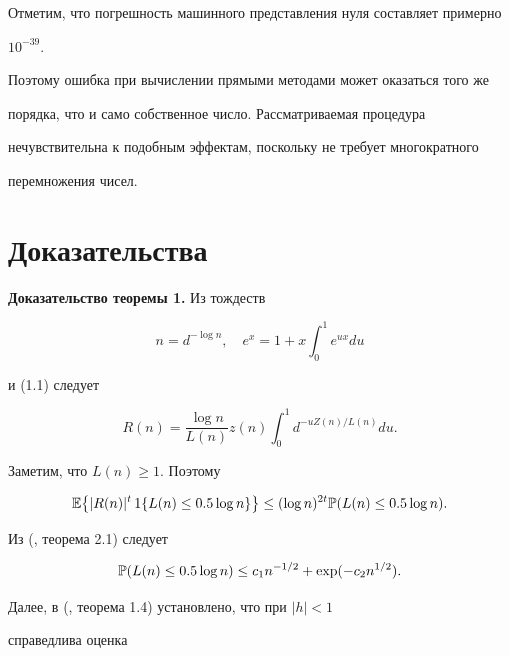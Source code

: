  


Отметим, что погрешность машинного представления нуля составляет примерно 


$10^{-39}$. 


Поэтому ошибка при вычислении прямыми методами может оказаться того же 


порядка, что и само собственное число. Рассматриваемая процедура 


нечувствительна к подобным эффектам, поскольку не требует многократного 


перемножения чисел. 


 


\section{Доказательства} 


 


{\bf Доказательство теоремы 1.} Из тождеств 


$$ 


n=d^{-\log n},\quad e^x=1+x\int^1_0 e^{ux}du 


$$ 


и (1.1) следует 


\begin{equation} 


R(n)=\frac{\log n}{L(n)} z(n)\int^1_0 d^{-uZ(n)/L(n)}du. 


\end{equation} 


Заметим, что $L(n)\ge 1$. Поэтому 


\begin{equation} 


\Bbb E\bigl\{|R(n)|^t\,1\{L(n)\le 0{.}5\log n\}\bigr\}\le 


(\log n)^{2t}\Bbb P(L(n)\le 0{.}5\log n). 


\end{equation} 


Из (\cite{Nov2}, теорема 2.1) следует 


\begin{equation} 


\Bbb P(L(n)\le 0{.}5\log n)\le c_1 n^{-1/2}+\exp(-c_2n^{1/2}). 


\end{equation} 


Далее, в (\cite{Nov2}, теорема 1.4) установлено, что при $|h|<1$ 


справедлива оценка 



